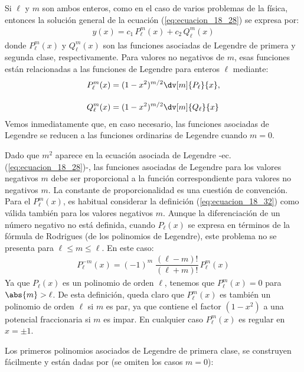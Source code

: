 Si $\ell$ y $m$ son ambos enteros, como en el caso de varios problemas de la física, entonces la solución general de la ecuación (\ref{eq:ecuacion_18_28}) se expresa por:
\begin{align}
y (x) = c_{1} \, P_{\ell}^{m} (x) + c_{2} \, Q_{\ell}^{m} (x)
\label{eq:ecuacion_18_31}
\end{align}
donde $P_{\ell}^{m} (x)$ y $Q_{\ell}^{m} (x)$ son las funciones asociadas de Legendre de primera y segunda clase, respectivamente. Para valores no negativos de $m$, esas funciones están relacionadas a las funciones de Legendre para enteros $\ell$ mediante:
\begin{align}
\begin{aligned}
P_{\ell}^{m} (x) &= (1 - x^{2})^{m/2} \dv[m]{P_{\ell}}{x}, \\[1em]
Q_{\ell}^{m} (x) &= (1 - x^{2})^{m/2} \dv[m]{Q_{\ell}}{x}
\end{aligned}
\label{eq:ecuacion_18_32}
\end{align}
Vemos inmediatamente que, en caso necesario, las funciones asociadas de Legendre se reducen a las funciones ordinarias de Legendre cuando $m = 0$. 
\par
Dado que $m^{2}$ aparece en la ecuación asociada de Legendre -ec. (\ref{eq:ecuacion_18_28})-, las funciones asociadas de Legendre para los valores negativos $m$ debe ser proporcional a la función correspondiente para valores no negativos $m$. La constante de proporcionalidad es una cuestión de convención. Para el $P_{\ell}^{m} (x) $, es habitual considerar la definición (\ref{eq:ecuacion_18_32}) como válida también para los valores negativos $m$. Aunque la diferenciación de un número negativo no está definida, cuando $P_{\ell}(x)$ se expresa en términos de la fórmula de Rodrigues (de los polinomios de Legendre), este problema no se presenta para $\ell \leq m \leq \ell$. En este caso:
\begin{align}
P_{\ell}^{-m} (x) = (-1)^{m} \; \dfrac{(\ell - m)!}{(\ell + m)!} \, P_{\ell}^{m} (x)
\label{eq:ecuacion_18_33}
\end{align}
Ya que $P_{\ell}(x)$ es un polinomio de orden $\ell$, tenemos que $P_{\ell}^{m}(x)=0$ para $\abs{m} > \ell$. De esta definición, queda claro que $P_{\ell}^{m} (x)$ es también un polinomio de orden $\ell$ si $m$ es par, ya que contiene el factor $(1-x^{2})$ a una potencial fraccionaria si $m$ es impar. En cualquier caso $P_{\ell}^{m}(x)$ es regular en $x = \pm 1$.
\par
Los primeros polinomios asociados de Legendre de primera clase, se construyen fácilmente y están dadas por (se omiten los casos $m=0$):
